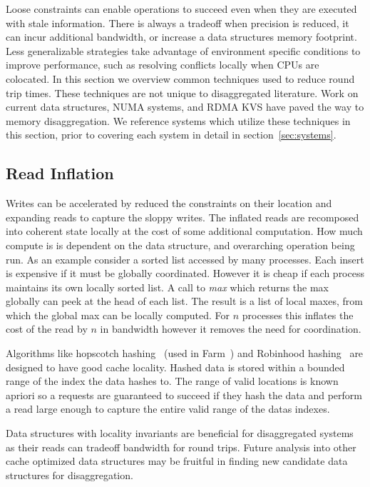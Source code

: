 Loose constraints can enable operations to succeed even when they are executed
with stale information. There is always a tradeoff when precision is reduced, it
can incur additional bandwidth, or increase a data structures memory footprint.
Less generalizable strategies take advantage of environment specific conditions
to improve performance, such as resolving conflicts locally when CPUs are
colocated. In this section we overview common techniques used to reduce round
trip times. These techniques are not unique to disaggregated literature.  Work
on current data structures, NUMA systems, and RDMA KVS have paved the way to
memory disaggregation. We reference systems which utilize these techniques in
this section, prior to covering each system in detail in
section~\ref{sec:systems}.


\subsection{Read Inflation} \label{sec:readsize}
Writes can be accelerated by reduced the constraints on their location and
expanding reads to capture the sloppy writes. The inflated reads are recomposed
into coherent state locally at the cost of some additional computation. How much
compute is is dependent on the data structure, and overarching operation being
run. As an example consider a sorted list accessed by many processes. Each
insert is expensive if it must be globally coordinated. However it is cheap if
each process maintains its own locally sorted list. A call to \textit{max} which
returns the max globally can peek at the head of each list. The result is a list
of local maxes, from which the global max can be locally computed.  For $n$
processes this inflates the cost of the read by $n$ in bandwidth however it
removes the need for coordination. 

Algorithms like hopscotch hashing~\cite{hopscotch} (used in Farm~\cite{farm})
and Robinhood hashing~\cite{robinhood} are designed to have good cache locality.
Hashed data is stored within a bounded range of the index the data hashes to.
The range of valid locations is known apriori so a requests are guaranteed to
succeed if they hash the data and perform a read large enough to capture the
entire valid range of the datas indexes.

Data structures with locality invariants are beneficial for disaggregated
systems as their reads can tradeoff bandwidth for round trips. Future
analysis into other cache optimized data structures may be fruitful in finding
new candidate data structures for disaggregation.

